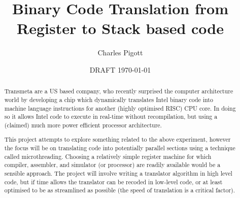 \documentclass[11pt,a4paper,notitlepage]{report}
\title{Binary Code Translation from Register to Stack based code}
\author{Charles Pigott}
\date{DRAFT \today}
\begin{document}
\maketitle

\begin{abstract}
Transmeta are a US based company, who recently surprised the computer
architecture world by developing a chip which dynamically translates Intel
binary code into machine language instructions for another (highly optimised
RISC) CPU core. In doing so it allows Intel code to execute in real-time without
recompilation, but using a (claimed) much more power efficient processor
architecture.

This project attempts to explore something related to the above experiment,
however the focus will be on translating code into potentially parallel sections
using a technique called microthreading. Choosing a relatively simple register
machine for which compiler, assembler, and simulator (or processor) are readily
available would be a sensible approach. The project will involve writing a
translator algorithm in high level code, but if time allows the translator can
be recoded in low-level code, or at least optimised to be as streamlined as
possible (the speed of translation is a critical factor).
\end{abstract}

\cleardoublepage%

\tableofcontents








\printbibliography%
\clearpage

\appendix

\end{document}
